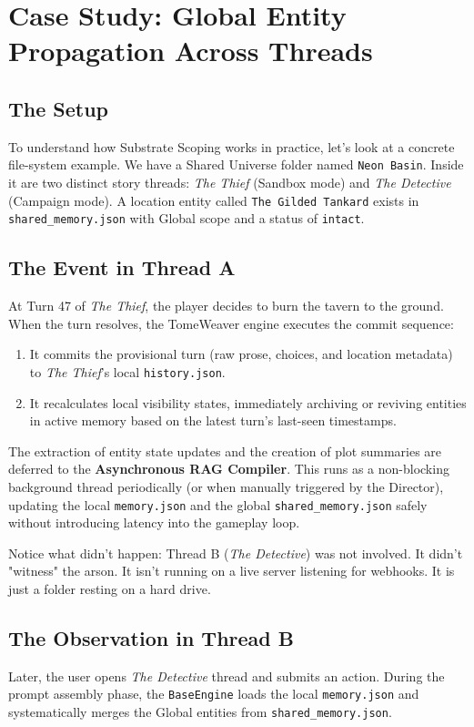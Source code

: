 \documentclass[12pt, a4paper]{article}
\begin{document}
\newpage
\section{Case Study: Global Entity Propagation Across Threads}
\label{app:case_study}

\subsection{The Setup}
To understand how Substrate Scoping works in practice, let's look at a concrete file-system example. We have a Shared Universe folder named \texttt{Neon Basin}. Inside it are two distinct story threads: \textit{The Thief} (Sandbox mode) and \textit{The Detective} (Campaign mode). A location entity called \texttt{The Gilded Tankard} exists in \texttt{shared\_memory.json} with Global scope and a status of \texttt{intact}. 

\subsection{The Event in Thread A}
At Turn 47 of \textit{The Thief}, the player decides to burn the tavern to the ground. When the turn resolves, the TomeWeaver engine executes the commit sequence:
\begin{enumerate}
    \item It commits the provisional turn (raw prose, choices, and location metadata) to \textit{The Thief}'s local \texttt{history.json}.
    \item It recalculates local visibility states, immediately archiving or reviving entities in active memory based on the latest turn's last-seen timestamps.
\end{enumerate}
The extraction of entity state updates and the creation of plot summaries are deferred to the \textbf{Asynchronous RAG Compiler}. This runs as a non-blocking background thread periodically (or when manually triggered by the Director), updating the local \texttt{memory.json} and the global \texttt{shared\_memory.json} safely without introducing latency into the gameplay loop.

Notice what didn't happen: Thread B (\textit{The Detective}) was not involved. It didn't "witness" the arson. It isn't running on a live server listening for webhooks. It is just a folder resting on a hard drive. 

\subsection{The Observation in Thread B}
Later, the user opens \textit{The Detective} thread and submits an action. During the prompt assembly phase, the \texttt{BaseEngine} loads the local \texttt{memory.json} and systematically merges the Global entities from \texttt{shared\_memory.json}. 
\end{document}
